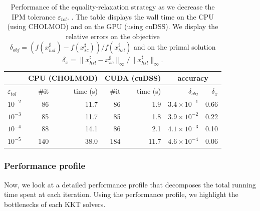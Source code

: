 \begin{table}[!ht]
  \centering
  \begin{tabular}{|l|rr|rr|rr|}
    \hline
    & \multicolumn{2}{c|}{\bf CPU (CHOLMOD)} & \multicolumn{2}{c|}{\bf CUDA (cuDSS)} & \multicolumn{2}{c|}{\bf accuracy} \\
    \hline
    $\varepsilon_{tol}$ & \#it & time (s) & \#it & time (s) & $\delta_{obj}$ & $\delta_{x}$ \\
    \hline
    $10^{-2}$ & 86  & 11.7 & 86  & 1.9  & $3.4 \times 10^{-1}$ & 0.66 \\
    $10^{-3}$ & 85  & 11.7 & 85  & 1.8  & $3.9 \times 10^{-2}$ & 0.22 \\
    $10^{-4}$ & 88  & 14.1 & 86  & 2.1  & $4.1 \times 10^{-3}$ & 0.10 \\
    $10^{-5}$ & 140 & 38.0 & 184 & 11.7 & $4.6 \times 10^{-4}$ & 0.06 \\
    \hline
  \end{tabular}
  \caption{Performance of the equality-relaxation
    strategy as we decrease the IPM tolerance $\varepsilon_{tol}$.
    \label{tab:sckkt:performance}.
    The table displays the wall time on the CPU (using CHOLMOD)
    and on the GPU (using cuDSS). We display the
    relative errors on the objective $\delta_{obj} = (f(x_{hsl}^\sharp) - f(x_{sc}^\sharp))/f(x_{hsl}^\sharp)$
    and on the primal solution $\delta_x = \|x_{hsl}^\sharp - x_{sc}^\sharp\|_\infty
    / \|x_{hsl}^\sharp\|_\infty$.
  }
\end{table}


\subsubsection{Performance profile}
Now, we look at a detailed performance profile that decomposes
the total running time spent at each iteration. Using the performance
profile, we highlight the bottlenecks of each KKT solvers.


